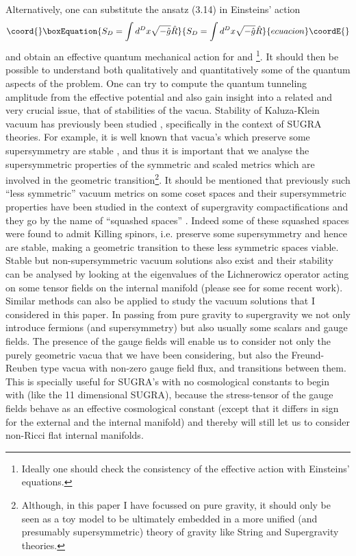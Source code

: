 \documentclass[a4paper,12pt]{article}
\begin{document}
Alternatively, one can substitute the ansatz (3.14) in Einsteins' action
\begin{equation}\coord{}\boxEquation{ S_{D}=\int d^{D}x \sqrt{-\hat{g}}\hat{R} }{ S_{D}=\int d^{D}x \sqrt{-\hat{g}}\hat{R} }{ecuacion}\coordE{}\end{equation}
and obtain an effective quantum mechanical action for \coordHE{} and \coordHE{}\footnote{ Ideally one should check the consistency of the effective action with Einsteins' equations.}.  It should then be possible to understand both qualitatively and quantitatively some of the quantum aspects of the problem. One can try to  compute the  quantum tunneling amplitude from the effective potential and also gain insight into a related and very crucial issue, that of stabilities of the vacua.
Stability of Kaluza-Klein vacuum has previously been studied \cite{stability}, specifically in the context of SUGRA theories. For example, it is well known that vacua's which preserve some supersymmetry are stable \cite{stability}, and thus it is important that we analyse the supersymmetric properties of the symmetric and scaled metrics which are involved in the geometric transition\footnote{Although, in this paper I have focussed on pure gravity, it should  only be seen as a toy model to be ultimately embedded in a more unified (and presumably supersymmetric) theory of gravity like String and Supergravity theories.}. It should be mentioned that previously such ``less symmetric'' vacuum metrics on some coset spaces and their supersymmetric properties have been studied  in the context of supergravity compactifications and they go by the name of ``squashed spaces'' \cite{squashed}. Indeed some of these squashed spaces were found to admit Killing spinors, i.e. preserve some supersymmetry and hence are stable, making a geometric transition to these less symmetric spaces viable. Stable but  non-supersymmetric vacuum solutions also exist and their stability can be analysed by looking at the eigenvalues of the Lichnerowicz operator acting on some tensor fields on the internal manifold (please see \cite{horowitz} for some recent work). Similar methods can also be applied to study the vacuum solutions that I considered in this paper. 
In passing from pure gravity to supergravity we not only introduce fermions (and supersymmetry) but also usually some scalars and gauge fields. The presence of the gauge fields will enable us to consider not only the purely geometric vacua that we have been considering, but also the Freund-Reuben type vacua \cite{freund} with non-zero gauge field flux, and transitions between them. This is specially useful for SUGRA's with no cosmological constants to begin with (like the 11 dimensional SUGRA), because the stress-tensor of the gauge fields behave as an effective cosmological constant (except that it differs in sign for the external and the internal manifold) and thereby will still let us to consider non-Ricci flat internal manifolds.  
\setcounter{equation}{0}
\end{document}
